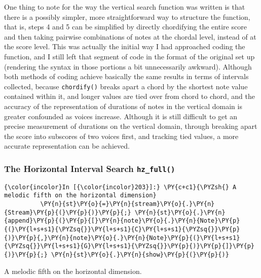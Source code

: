 One thing to note for the way the vertical search function was written
is that there is a possibly simpler, more straightforward way to
structure the function, that is, steps 4 and 5 can be simplified by
directly chordifying the entire score and then taking pairwise
combinations of notes at the chordal level, instead of at the score
level. This was actually the initial way I had approached coding the
function, and I still left that segment of code in the format of the
original set up (rendering the syntax in those portions a bit
unnecessarily awkward). Although both methods of coding achieve
basically the same results in terms of intervals collected, because
\texttt{chordify()} breaks apart a chord by the shortest note value
contained within it, and longer values are tied over from chord to
chord, and the accuracy of the representation of durations of notes in
the vertical domain is greater confounded as voices increase. Although
it is still difficult to get an precise measurement of durations on the
vertical domain, through breaking apart the score into subscores of two
voices first, and tracking tied values, a more accurate representation
can be achieved.

\subsubsection{\texorpdfstring{The Horizontal Interval Search
\texttt{hz\_full()}}{The Horizontal Interval Search hz\_full()}}\label{the-horizontal-interval-search-hz_full}


    \begin{Verbatim}[commandchars=\\\{\}]
{\color{incolor}In [{\color{incolor}203}]:} \PY{c+c1}{\PYZsh{} A melodic fifth on the horizontal dimension}
          \PY{n}{st}\PY{o}{=}\PY{n}{stream}\PY{o}{.}\PY{n}{Stream}\PY{p}{(}\PY{p}{)}\PY{p}{;} \PY{n}{st}\PY{o}{.}\PY{n}{append}\PY{p}{(}\PY{p}{[}\PY{n}{note}\PY{o}{.}\PY{n}{Note}\PY{p}{(}\PY{l+s+s1}{\PYZsq{}}\PY{l+s+s1}{C}\PY{l+s+s1}{\PYZsq{}}\PY{p}{)}\PY{p}{,}\PY{n}{note}\PY{o}{.}\PY{n}{Note}\PY{p}{(}\PY{l+s+s1}{\PYZsq{}}\PY{l+s+s1}{G}\PY{l+s+s1}{\PYZsq{}}\PY{p}{)}\PY{p}{]}\PY{p}{)}\PY{p}{;} \PY{n}{st}\PY{o}{.}\PY{n}{show}\PY{p}{(}\PY{p}{)}
\end{Verbatim}

\begin{Example}[H]
    \begin{center}
    \caption{ A melodic fifth on the horizontal dimension. }
    \end{center}
\end{Example}
    
